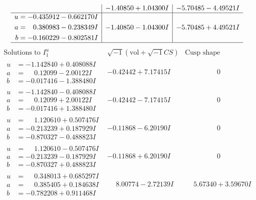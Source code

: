 \documentclass[1p]{elsarticle_modified}
\theoremstyle{definition}
\newcommand{\I}{\sqrt{-1}}
\begin{document}
$$\begin{array}{c|c|c}
 & -1.40850 + 1.04300 I & -5.70485 - 4.49521 I \\ \hline\begin{aligned}
u &= -0.435912 - 0.662170 I \\
a &= \phantom{-}0.380983 - 0.238349 I \\
b &= -0.160229 - 0.802581 I\end{aligned}
 & -1.40850 - 1.04300 I & -5.70485 + 4.49521 I\\
 \hline 
 \end{array}$$\newpage$$\begin{array}{c|c|c}  
\text{Solutions to }I^u_{1}& \I (\text{vol} + \sqrt{-1}CS) & \text{Cusp shape}\\
 \hline 
\begin{aligned}
u &= -1.142840 + 0.408088 I \\
a &= \phantom{-}0.12099 - 2.00122 I \\
b &= -0.017416 - 1.388480 I\end{aligned}
 & -0.42442 + 7.17415 I & \phantom{-0.000000 } 0 \\ \hline\begin{aligned}
u &= -1.142840 - 0.408088 I \\
a &= \phantom{-}0.12099 + 2.00122 I \\
b &= -0.017416 + 1.388480 I\end{aligned}
 & -0.42442 - 7.17415 I & \phantom{-0.000000 } 0 \\ \hline\begin{aligned}
u &= \phantom{-}1.120610 + 0.507476 I \\
a &= -0.213239 + 0.187929 I \\
b &= -0.870327 - 0.488823 I\end{aligned}
 & -0.11868 - 6.20190 I & \phantom{-0.000000 } 0 \\ \hline\begin{aligned}
u &= \phantom{-}1.120610 - 0.507476 I \\
a &= -0.213239 - 0.187929 I \\
b &= -0.870327 + 0.488823 I\end{aligned}
 & -0.11868 + 6.20190 I & \phantom{-0.000000 } 0 \\ \hline\begin{aligned}
u &= \phantom{-}0.348013 + 0.685297 I \\
a &= \phantom{-}0.385405 + 0.184638 I \\
b &= -0.782208 + 0.911468 I\end{aligned}
 & \phantom{-}8.00774 - 2.72139 I & \phantom{-}5.67340 + 3.59670 I \\ \hline\begin{aligned}

\end{aligned}
\end{array}$$
\end{document}
